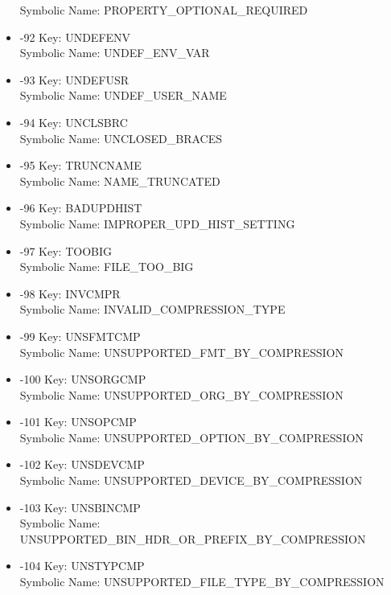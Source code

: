 \begin{itemize}
Symbolic Name: PROPERTY\_OPTIONAL\_REQUIRED
\item -92 Key: UNDEFENV \\
Symbolic Name: UNDEF\_ENV\_VAR
\item -93 Key: UNDEFUSR \\
Symbolic Name: UNDEF\_USER\_NAME
\item -94 Key: UNCLSBRC \\
Symbolic Name: UNCLOSED\_BRACES
\item -95 Key: TRUNCNAME \\
Symbolic Name: NAME\_TRUNCATED
\item -96 Key: BADUPDHIST \\
Symbolic Name: IMPROPER\_UPD\_HIST\_SETTING
\item -97 Key: TOOBIG \\
Symbolic Name: FILE\_TOO\_BIG
\item -98 Key: INVCMPR \\
Symbolic Name: INVALID\_COMPRESSION\_TYPE
\item -99 Key: UNSFMTCMP \\
Symbolic Name: UNSUPPORTED\_FMT\_BY\_COMPRESSION
\item -100 Key: UNSORGCMP \\
Symbolic Name: UNSUPPORTED\_ORG\_BY\_COMPRESSION
\item -101 Key: UNSOPCMP \\
Symbolic Name: UNSUPPORTED\_OPTION\_BY\_COMPRESSION
\item -102 Key: UNSDEVCMP \\
Symbolic Name: UNSUPPORTED\_DEVICE\_BY\_COMPRESSION
\item -103 Key: UNSBINCMP \\
Symbolic Name: UNSUPPORTED\_BIN\_HDR\_OR\_PREFIX\_BY\_COMPRESSION
\item -104 Key: UNSTYPCMP \\
Symbolic Name: UNSUPPORTED\_FILE\_TYPE\_BY\_COMPRESSION
\end{itemize}

